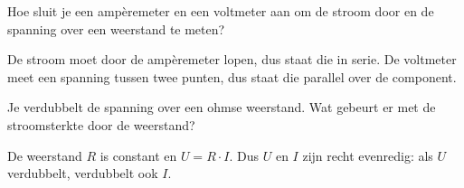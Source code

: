 \documentclass{ximera}
\begin{document}
\begin{question}
    Hoe sluit je een ampèremeter en een voltmeter aan om de stroom door en de spanning over een weerstand te meten?
    \begin{multipleChoice}
    \end{multipleChoice}
    \begin{solution}
        De stroom moet door de ampèremeter lopen, dus staat die in serie. De voltmeter meet een spanning tussen twee punten, dus staat die parallel over de component.
    \end{solution}
\end{question}
\begin{question}
    Je verdubbelt de spanning over een ohmse weerstand. Wat gebeurt er met de stroomsterkte door de weerstand?
    \begin{multipleChoice}
    \end{multipleChoice}
    \begin{solution}
        De weerstand $R$ is constant en $U = R \cdot I$. Dus $U$ en $I$ zijn recht evenredig: als $U$ verdubbelt, verdubbelt ook $I$.
    \end{solution}
\end{question}
\end{document}
